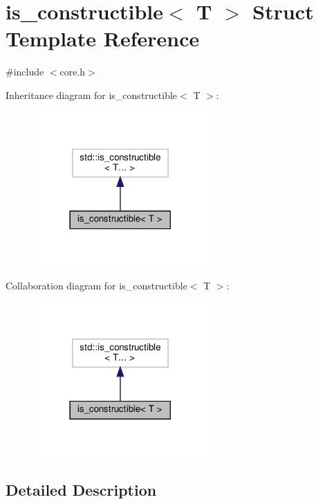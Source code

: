 \hypertarget{structis__constructible}{}\section{is\+\_\+constructible$<$ T $>$ Struct Template Reference}
\label{structis__constructible}


{\ttfamily \#include $<$core.\+h$>$}



Inheritance diagram for is\+\_\+constructible$<$ T $>$\+:
\nopagebreak
\begin{figure}[H]
\begin{center}
\leavevmode
\includegraphics[width=189pt]{structis__constructible__inherit__graph}
\end{center}
\end{figure}


Collaboration diagram for is\+\_\+constructible$<$ T $>$\+:
\nopagebreak
\begin{figure}[H]
\begin{center}
\leavevmode
\includegraphics[width=189pt]{structis__constructible__coll__graph}
\end{center}
\end{figure}


\subsection{Detailed Description}
